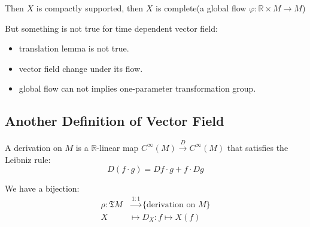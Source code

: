 Then  $ X  $ is compactly supported, then  $ X $ is complete(\ie a global flow  $ \varphi:\mathbb{R}\times M \rightarrow M$)

But something is not true for time dependent vector field:
\begin{itemize}
    \item translation lemma is not true.
    \item vector field change under its flow.
    \item global flow can not implies one-parameter transformation group.
\end{itemize}
\subsection{Another Definition of Vector Field}
A derivation on   $ M  $ is a  $ \mathbb{R} $-linear map  $ C^\infty(M)\xrightarrow{D}C^\infty(M) $ that satisfies the Leibniz rule:
\[D(f\cdot g)=Df\cdot g+f\cdot Dg\] 
\begin{theorem}

    We have a bijection:
    \begin{align*}
        \rho:\mathfrak{T}M&\xrightarrow{1:1}\{\text{derivation on }M\}\\
        X&\mapsto D_X:f\mapsto X(f)
    \end{align*}
\end{theorem} 
